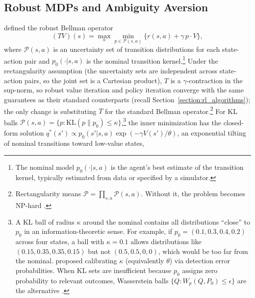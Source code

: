 
\subsection{Robust MDPs and Ambiguity Aversion}
\label{subsec:robust_mdps}

\citet{Iyengar2005} defined the robust Bellman operator
\begin{equation}
  (TV)(s) = \max_a \min_{p \in \mathcal{P}(s,a)}
  \bigl\{r(s,a) + \gamma \, p \cdot V\bigr\},
  \label{eq:robust_bellman}
\end{equation}
where $\mathcal{P}(s,a)$ is an uncertainty set of transition
distributions for each state-action pair and $p_0(\cdot|s,a)$ is the
nominal transition kernel.\footnote{The nominal model $p_0(\cdot|s,a)$ is
the agent's best estimate of the transition kernel, typically estimated
from data or specified by a simulator.} Under the rectangularity assumption (the uncertainty sets are independent
across state-action pairs, so the joint set is a Cartesian product),
$T$ is a $\gamma$-contraction in
the sup-norm, so robust value iteration and policy iteration converge
with the same guarantees as their standard counterparts (recall
Section~\ref{section:rl_algorithms}); the only change is substituting $T$
for the standard Bellman operator.\footnote{Rectangularity means
$\mathcal{P} = \prod_{s,a} \mathcal{P}(s,a)$. Without it, the problem
becomes NP-hard \citep{Wiesemann2013}.} For
KL balls $\mathcal{P}(s,a) = \{p : \text{KL}(p \| p_0) \leq
\kappa\}$,\footnote{A KL ball of radius $\kappa$ around the nominal
contains all distributions ``close'' to $p_0$ in an information-theoretic
sense. For example, if $p_0 = (0.1, 0.3, 0.4, 0.2)$ across four states,
a ball with $\kappa = 0.1$ allows distributions like
$(0.15, 0.35, 0.35, 0.15)$ but not $(0.5, 0.5, 0, 0)$, which would be
too far from the nominal. \citet{Barillas2009} proposed calibrating
$\kappa$ (equivalently $\theta$) via detection error probabilities.
When KL sets are insufficient because $p_0$ assigns zero probability to
relevant outcomes, Wasserstein balls
$\{Q : W_p(Q, P_0) \leq \epsilon\}$ are the alternative
\citep{Esfahani2018, GrandClement2021, Yu2023}.} the inner minimization
has the closed-form solution
$q^*(s') \propto p_0(s'|s,a) \exp(-\gamma V(s')/\theta)$, an
exponential tilting of nominal transitions toward low-value states,
